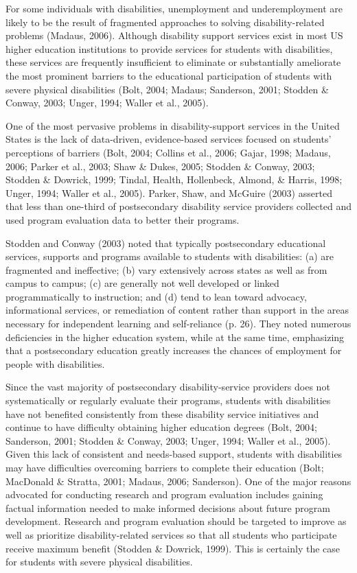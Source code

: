 \documentclass[11.5pt]{sig-alternate} %
\begin{document}
\begin{large}
For some individuals with disabilities, unemployment and underemployment are likely to be the result of fragmented approaches to solving disability-related problems (Madaus, 2006). Although disability support services exist in most US higher education institutions to provide services for students with disabilities, these services are frequently insufficient to eliminate or substantially ameliorate the most prominent barriers to the educational participation of students with severe physical disabilities (Bolt, 2004; Madaus; Sanderson, 2001; Stodden \& Conway, 2003; Unger, 1994; Waller et al., 2005).

One of the most pervasive problems in disability-support services in the United States is the lack of data-driven, evidence-based services focused on students' perceptions of barriers (Bolt, 2004; Collins et al., 2006; Gajar, 1998; Madaus, 2006; Parker et al., 2003; Shaw \& Dukes, 2005; Stodden \& 
Conway, 2003; Stodden \& Dowrick, 1999; Tindal, Health, Hollenbeck, Almond, \& Harris, 1998; Unger, 1994; Waller et al., 2005). Parker, Shaw, and McGuire (2003) asserted that less than one-third of postsecondary disability service providers collected and used program evaluation data to better their programs.

Stodden and Conway (2003) noted that typically postsecondary educational services, supports and programs available to students with disabilities: (a) are fragmented and ineffective; (b) vary extensively across states as well as from campus to campus; (c) are generally not well developed or linked programmatically to instruction; and (d) tend to lean toward advocacy, informational services, or remediation of content rather than support in the areas necessary for independent learning and self-reliance (p. 26). They noted numerous deficiencies in the higher education system, while at the same time, emphasizing that a postsecondary education greatly increases the chances of employment for people with disabilities.

Since the vast majority of postsecondary disability-service providers does not systematically or regularly evaluate their programs, students with disabilities have not benefited consistently from these disability service initiatives and continue to have difficulty obtaining higher education degrees (Bolt, 2004; Sanderson, 2001; Stodden \& Conway, 2003; Unger, 1994; Waller et al., 2005). Given this lack of consistent and needs-based support, students with disabilities may have difficulties overcoming barriers to complete their education (Bolt; MacDonald \& Stratta, 2001; Madaus, 2006; Sanderson). One of the major reasons advocated for conducting research and program evaluation includes gaining factual information needed to make informed decisions about future program development. Research and program evaluation should be targeted to improve as well as prioritize disability-related services so that all students who participate receive maximum benefit (Stodden \& Dowrick, 1999). This is certainly the case for students with severe physical disabilities. 


\end{large}
\end{document}
